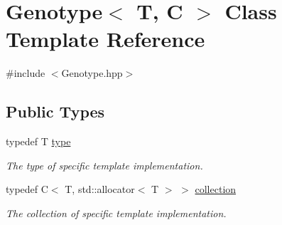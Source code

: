\hypertarget{classGenotype}{\section{Genotype$<$ T, C $>$ Class Template Reference}
\label{classGenotype}
}


{\ttfamily \#include $<$Genotype.\+hpp$>$}

\subsection*{Public Types}
\begin{DoxyCompactItemize}
\item 
\hypertarget{classGenotype_ae815fb1961ba244afc5eb2b54d75a7a2}{typedef T \hyperlink{classGenotype_ae815fb1961ba244afc5eb2b54d75a7a2}{type}}\label{classGenotype_ae815fb1961ba244afc5eb2b54d75a7a2}

\begin{DoxyCompactList}\small\item\em The type of specific template implementation. \end{DoxyCompactList}\item 
\hypertarget{classGenotype_a7d2341c93fc2c9e93a4ec4f89ed5cd27}{typedef C$<$ T, std\+::allocator$<$ T $>$ $>$ \hyperlink{classGenotype_a7d2341c93fc2c9e93a4ec4f89ed5cd27}{collection}}\label{classGenotype_a7d2341c93fc2c9e93a4ec4f89ed5cd27}

\begin{DoxyCompactList}\small\item\em The collection of specific template implementation. \end{DoxyCompactList}\end{DoxyCompactItemize}

